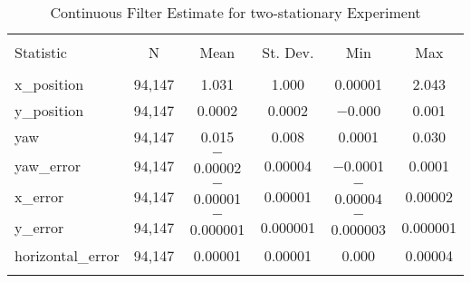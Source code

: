 
\begin{table}[h] \centering 
  \caption{Continuous Filter Estimate for two-stationary Experiment} 
  \label{tab:two_stationary_continuous_summary} 
\begin{tabular}{@{\extracolsep{5pt}}lccccc} 
\\[-1.8ex]\hline 
\hline \\[-1.8ex] 
Statistic & \multicolumn{1}{c}{N} & \multicolumn{1}{c}{Mean} & \multicolumn{1}{c}{St. Dev.} & \multicolumn{1}{c}{Min} & \multicolumn{1}{c}{Max} \\ 
\hline \\[-1.8ex] 
x\_position & 94,147 & 1.031 & 1.000 & 0.00001 & 2.043 \\ 
y\_position & 94,147 & 0.0002 & 0.0002 & $-$0.000 & 0.001 \\ 
yaw & 94,147 & 0.015 & 0.008 & 0.0001 & 0.030 \\ 
yaw\_error & 94,147 & $-$0.00002 & 0.00004 & $-$0.0001 & 0.0001 \\ 
x\_error & 94,147 & $-$0.00001 & 0.00001 & $-$0.00004 & 0.00002 \\ 
y\_error & 94,147 & $-$0.000001 & 0.000001 & $-$0.000003 & 0.000001 \\ 
horizontal\_error & 94,147 & 0.00001 & 0.00001 & 0.000 & 0.00004 \\ 
\hline \\[-1.8ex] 
\end{tabular} 
\end{table} 
